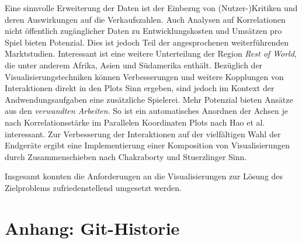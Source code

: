 \documentclass[usegeometry=true]{scrartcl}
\begin{document}
Eine sinnvolle Erweiterung der Daten ist der Einbezug von (Nutzer-)Kritiken und deren Auswirkungen auf die Verkaufszahlen. 
Auch Analysen auf Korrelationen nicht öffentlich zugänglicher Daten zu Entwicklungskosten und Umsätzen pro Spiel bieten Potenzial.
Dies ist jedoch Teil der angesprochenen weiterführenden Marktstudien.
Interessant ist eine weitere Unterteilung der Region \textit{Rest of World}, die unter anderem Afrika, Asien und Südamerika enthält.
Bezüglich der Visualisierungstechniken können Verbesserungen und weitere Kopplungen von Interaktionen direkt in den Plots Sinn ergeben, 
sind jedoch im Kontext der Andwendungsaufgaben eine zusätzliche Spielerei.
Mehr Potenzial bieten Ansätze aus den \textit{verwandten Arbeiten}. 
So ist ein automatisches Anordnen der Achsen je nach Korrelationsstärke im Parallelen Koordinaten Plots nach Hao et al. interessant.\cite{Hao.2007}
Zur Verbesserung der Interaktionen auf der vielfältigen Wahl der Endgeräte ergibt eine Implementierung einer Komposition von Visualisierungen durch Zusammenschieben nach Chakraborty und Stuerzlinger Sinn.\cite{Chakraborty.2021}

Insgesamt konnten die Anforderungen an die Visualisierungen zur Lösung des Zielproblems zufriedenstellend umgesetzt werden.
\newpage
\section*{Anhang: Git-Historie}

\printbibliography
\end{document}
